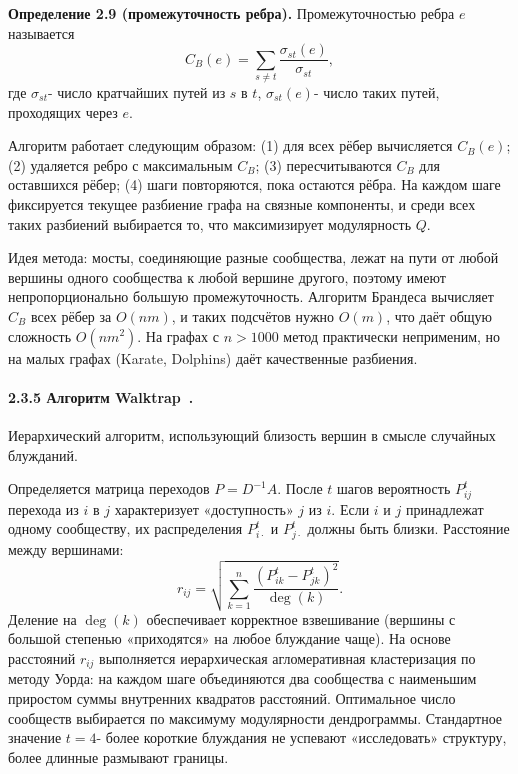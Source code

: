 \documentclass[14pt,a4paper]{extarticle}
\newcommand{\definition}[2]{\par\noindent\textbf{Определение #1.} #2\par}
\begin{document}
\definition{2.9 (промежуточность ребра)}{Промежуточностью ребра $e$ называется
\begin{equation}
C_B(e) = \sum_{s \neq t} \frac{\sigma_{st}(e)}{\sigma_{st}},
\end{equation}
где $\sigma_{st}$- число кратчайших путей из $s$ в $t$, $\sigma_{st}(e)$- число таких путей, проходящих через $e$.}

Алгоритм работает следующим образом: (1) для всех рёбер вычисляется $C_B(e)$; (2) удаляется ребро с максимальным $C_B$; (3) пересчитываются $C_B$ для оставшихся рёбер; (4) шаги повторяются, пока остаются рёбра. На каждом шаге фиксируется текущее разбиение графа на связные компоненты, и среди всех таких разбиений выбирается то, что максимизирует модулярность $Q$.

Идея метода: мосты, соединяющие разные сообщества, лежат на пути от любой вершины одного сообщества к любой вершине другого, поэтому имеют непропорционально большую промежуточность. Алгоритм Брандеса вычисляет $C_B$ всех рёбер за $O(nm)$, и таких подсчётов нужно $O(m)$, что даёт общую сложность $O(nm^2)$. На графах с $n > 1000$ метод практически неприменим, но на малых графах (Karate, Dolphins) даёт качественные разбиения.

\paragraph{2.3.5 Алгоритм Walktrap~\cite{pons2006}.} Иерархический алгоритм, использующий близость вершин в смысле случайных блужданий.

Определяется матрица переходов $P = D^{-1} A$. После $t$ шагов вероятность $P^t_{ij}$ перехода из $i$ в $j$ характеризует «доступность» $j$ из $i$. Если $i$ и $j$ принадлежат одному сообществу, их распределения $P^t_{i\cdot}$ и $P^t_{j\cdot}$ должны быть близки. Расстояние между вершинами:
\begin{equation}
r_{ij} = \sqrt{\sum_{k=1}^{n} \frac{(P_{ik}^t - P_{jk}^t)^2}{\deg(k)}}.
\end{equation}
Деление на $\deg(k)$ обеспечивает корректное взвешивание (вершины с большой степенью «приходятся» на любое блуждание чаще). На основе расстояний $r_{ij}$ выполняется иерархическая агломеративная кластеризация по методу Уорда: на каждом шаге объединяются два сообщества с наименьшим приростом суммы внутренних квадратов расстояний. Оптимальное число сообществ выбирается по максимуму модулярности дендрограммы. Стандартное значение $t = 4$- более короткие блуждания не успевают «исследовать» структуру, более длинные размывают границы.
\end{document}
